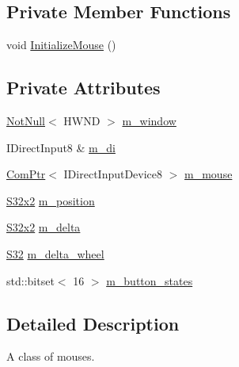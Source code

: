 \subsection*{Private Member Functions}
\begin{DoxyCompactItemize}
\item 
void \mbox{\hyperlink{classmage_1_1input_1_1_mouse_a8209bbaf255c2e93ee1cd8f3937cd8ab}{Initialize\+Mouse}} ()
\end{DoxyCompactItemize}
\subsection*{Private Attributes}
\begin{DoxyCompactItemize}
\item 
\mbox{\hyperlink{namespacemage_a8769f9d670d6b585ea306cb1062af94b}{Not\+Null}}$<$ H\+W\+ND $>$ \mbox{\hyperlink{classmage_1_1input_1_1_mouse_a9fc088bd15bc89c9791642e4a95e81bc}{m\+\_\+window}}
\item 
I\+Direct\+Input8 \& \mbox{\hyperlink{classmage_1_1input_1_1_mouse_a35e656946a3cbb7253abaeeec30642df}{m\+\_\+di}}
\item 
\mbox{\hyperlink{namespacemage_ae74f374780900893caa5555d1031fd79}{Com\+Ptr}}$<$ I\+Direct\+Input\+Device8 $>$ \mbox{\hyperlink{classmage_1_1input_1_1_mouse_acce273ae24a5f7ba107f2f15618bbea6}{m\+\_\+mouse}}
\item 
\mbox{\hyperlink{namespacemage_aad06aca0b442d3b41653eafed822d571}{S32x2}} \mbox{\hyperlink{classmage_1_1input_1_1_mouse_a240e60291f97e6b281d11cfd52d38e53}{m\+\_\+position}}
\item 
\mbox{\hyperlink{namespacemage_aad06aca0b442d3b41653eafed822d571}{S32x2}} \mbox{\hyperlink{classmage_1_1input_1_1_mouse_ac2e7872b793012d52c9f1b1b1206f6d6}{m\+\_\+delta}}
\item 
\mbox{\hyperlink{namespacemage_a2ef1a005a77358f1825d13fd481b557f}{S32}} \mbox{\hyperlink{classmage_1_1input_1_1_mouse_ab71a69d6a727b67065643d5dc929ee33}{m\+\_\+delta\+\_\+wheel}}
\item 
std\+::bitset$<$ 16 $>$ \mbox{\hyperlink{classmage_1_1input_1_1_mouse_a7a11cd8de9e8dda4ef40c31670b04b00}{m\+\_\+button\+\_\+states}}
\end{DoxyCompactItemize}


\subsection{Detailed Description}
A class of mouses. 

